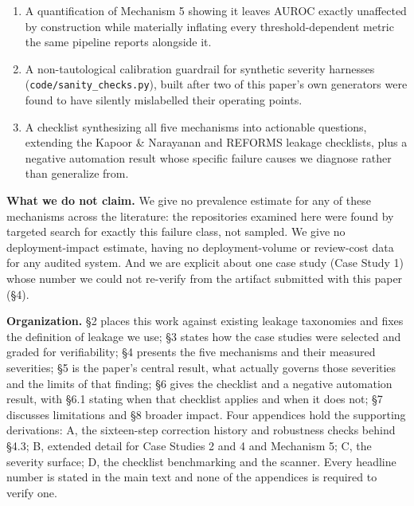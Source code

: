 \documentclass[10pt]{article} %
\begin{document}
\begin{enumerate}
   and with the $7$ cells on which the leave-one-seed-out estimator is
   \emph{algebraically} degenerate identified as such, excluded from the
   headline, and characterized against a permutation null rather than
   averaged in as zeros (§4.4).
\item A quantification of Mechanism 5 showing it leaves AUROC exactly
   unaffected by construction while materially inflating every
   threshold-dependent metric the same pipeline reports alongside it.
\item A non-tautological calibration guardrail for synthetic severity
   harnesses (\texttt{code/sanity\_checks.py}), built after two of this
   paper's own generators were found to have silently mislabelled their
   operating points.
\item A checklist synthesizing all five mechanisms into actionable
   questions, extending the Kapoor \& Narayanan and REFORMS leakage
   checklists, plus a negative automation result whose specific failure
   causes we diagnose rather than generalize from.
\end{enumerate}

\textbf{What we do not claim.} We give no prevalence estimate for any of
these mechanisms across the literature: the repositories examined here
were found by targeted search for exactly this failure class, not
sampled. We give no deployment-impact estimate, having no
deployment-volume or review-cost data for any audited system. And we are
explicit about one case study (Case Study 1) whose number we could not
re-verify from the artifact submitted with this paper (§4).

\textbf{Organization.} §2 places this work against existing leakage taxonomies
and fixes the definition of leakage we use; §3 states how the case studies were
selected and graded for verifiability; §4 presents the five mechanisms and
their measured severities; §5 is the paper's central result, what actually
governs those severities and the limits of that finding; §6 gives the checklist
and a negative automation result, with §6.1 stating when that checklist applies
and when it does not; §7 discusses limitations and §8 broader impact. Four appendices
hold the supporting derivations: A, the sixteen-step correction history and
robustness checks behind §4.3; B, extended detail for Case Studies 2 and 4 and
Mechanism 5; C, the severity surface; D, the checklist benchmarking and the
scanner. Every headline number is stated in the main text and none of the
appendices is required to verify one.
\end{document}
